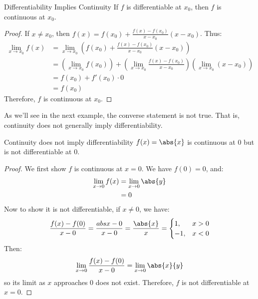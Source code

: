 \begin{thmbox}{Differentiability Implies Continuity}{}
    If $f$ is differentiable at $x_0$, then $f$ is continuous at $x_0$.
    \tcblower
    \begin{proof}
        If $x \neq x_0$, then $f(x) = f(x_0) + \frac{f(x) - f(x_0)}{x - x_0} (x - x_0)$. Thus:
        \begin{align*}
            \lim_{x \to x_0} f(x)
            &= \lim_{x \to x_0} \left( f(x_0) + \frac{f(x) - f(x_0)}{x - x_0} (x - x_0) \right) \\
            &= \left( \lim_{x \to x_0} f(x_0) \right) + \left( \lim_{x \to x_0} \frac{f(x) - f(x_0)}{x - x_0} \right) \left( \lim_{x \to x_0} (x - x_0) \right) \\
            &= f(x_0) + f\prime (x_0) \cdot 0 \\
            &= f(x_0)
        \end{align*}
        Therefore, $f$ is continuous at $x_0$.
    \end{proof}
\end{thmbox}

As we'll see in the next example, the converse statement is not true. That is, continuity does not generally imply differentiability.

\begin{exbox}{Continuity does not imply differentiability}{}
    $f(x) = \abs{x}$ is continuous at $0$ but is not differentiable at $0$.
    \tcblower
    \begin{proof}
        We first show $f$ is continuous at $x = 0$. We have $f(0) = 0$, and:
        \begin{align*}
            \lim_{x \to 0} f(x)
            &= \lim_{x \to 0} \abs{y} \\
            &= 0
        \end{align*}
        Now to show it is not differentiable, if $x \neq 0$, we have:
        \[ \frac{f(x) - f(0)}{x - 0} = \frac{abs{x} - 0}{x - 0} = \frac{\abs{x}}{x} = \begin{cases}1, & x>0 \\ -1, & x < 0 \end{cases} \]
        Then:
        \[ \lim_{x \to 0} \frac{f(x) - f(0)}{x - 0} = \lim_{x \to 0} \abs{x}{y} \]
        so its limit as $x$ approaches $0$ does not exist. Therefore, $f$ is not differentiable at $x = 0$.
    \end{proof}
\end{exbox}

